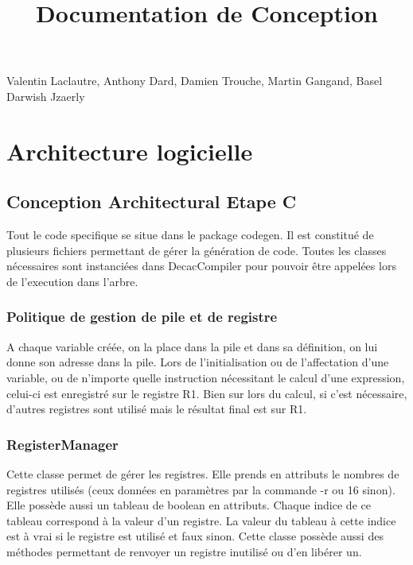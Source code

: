 \documentclass[12pt, a4paper, one side]{article}
\title{Documentation de Conception}
\author{}
\date{}
\begin{document}
    \maketitle

    \begin{center}
        Valentin Laclautre, Anthony Dard, Damien Trouche, Martin Gangand, Basel Darwish Jzaerly
    \end{center}

    \tableofcontents
    \section{Architecture logicielle}

    \subsection{Conception Architectural Etape C}

    Tout le code specifique se situe dans le package codegen. Il est constitué de plusieurs fichiers
    permettant de gérer la génération de code. Toutes les classes nécessaires sont instanciées dans DecacCompiler
    pour pouvoir être appelées lors de l'execution dans l'arbre.

    \subsubsection{Politique de gestion de pile et de registre}

    A chaque variable créée, on la place dans la pile et dans sa définition, on lui donne son adresse dans la pile.
    Lors de l'initialisation ou de l'affectation d'une variable, ou de n'importe quelle instruction nécessitant le
    calcul d'une expression, celui-ci est enregistré sur le registre R1. Bien sur lors du calcul, si c'est nécessaire,
    d'autres registres sont utilisé mais le résultat final est sur R1.

    \subsubsection{RegisterManager}

    Cette classe permet de gérer les registres. Elle prends en attributs le nombres de registres utilisés
    (ceux données en paramètres par la commande -r ou 16 sinon). Elle possède aussi un tableau de boolean
    en attributs. Chaque indice de ce tableau correspond à la valeur d'un registre. La valeur du tableau
    à cette indice est à vrai si le registre est utilisé et faux sinon. Cette classe possède aussi des
    méthodes permettant de renvoyer un registre inutilisé ou d'en libérer un.
\end{document}
